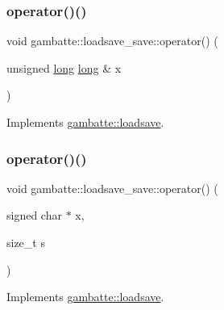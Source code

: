 \subsubsection{\texorpdfstring{operator()()}{operator()()}\hspace{0.1cm}{\footnotesize\ttfamily [9/19]}}
{\footnotesize\ttfamily void gambatte\+::loadsave\+\_\+save\+::operator() (\begin{DoxyParamCaption}\item[{unsigned \hyperlink{ioapi_8h_a3c7b35ad9dab18b8310343c201f7b27e}{long} \hyperlink{ioapi_8h_a3c7b35ad9dab18b8310343c201f7b27e}{long} \&}]{x }\end{DoxyParamCaption})\hspace{0.3cm}{\ttfamily [virtual]}}



Implements \hyperlink{classgambatte_1_1loadsave_aca5dcc05e845b6aa3086065048ab6e29}{gambatte\+::loadsave}.

\mbox{\label{classgambatte_1_1loadsave__save_a55e184031d552364869557fa261dd8a3}} 
\subsubsection{\texorpdfstring{operator()()}{operator()()}\hspace{0.1cm}{\footnotesize\ttfamily [10/19]}}
{\footnotesize\ttfamily void gambatte\+::loadsave\+\_\+save\+::operator() (\begin{DoxyParamCaption}\item[{signed char $\ast$}]{x,  }\item[{size\+\_\+t}]{s }\end{DoxyParamCaption})\hspace{0.3cm}{\ttfamily [virtual]}}



Implements \hyperlink{classgambatte_1_1loadsave_a8ba29ce3f56dbaa7ac1d4aec4b705af3}{gambatte\+::loadsave}.

\mbox{\label{classgambatte_1_1loadsave__save_a3fd21e1304933c50846c1cea2fde800f}} 
